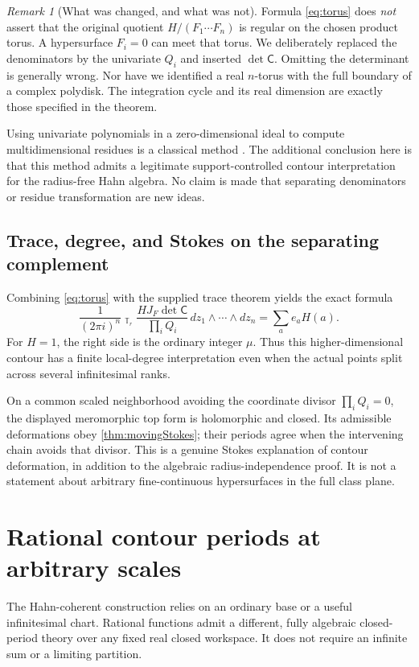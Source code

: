 \documentclass[11pt,letterpaper]{article}
\theoremstyle{definition}
\theoremstyle{remark}
\newtheorem{remark}[theorem]{Remark}
\newcommand{\HInt}{\mathop{\int^{\!H}}\nolimits}
\numberwithin{equation}{section}
\begin{document}
\begin{remark}[What was changed, and what was not]\label{rem:toruslimits}
Formula \eqref{eq:torus} does \emph{not} assert that the original quotient $H/(F_1\cdots F_n)$ is regular on the chosen product torus. A hypersurface $F_i=0$ can meet that torus. We deliberately replaced the denominators by the univariate $Q_i$ and inserted $\det\mathsf C$. Omitting the determinant is generally wrong. Nor have we identified a real $n$-torus with the full boundary of a complex polydisk. The integration cycle and its real dimension are exactly those specified in the theorem.
\end{remark}
Using univariate polynomials in a zero-dimensional ideal to compute multidimensional residues is a classical method \cite[\S0]{CDS}. The additional conclusion here is that this method admits a legitimate support-controlled contour interpretation for the radius-free Hahn algebra. No claim is made that separating denominators or residue transformation are new ideas.

\subsection{Trace, degree, and Stokes on the separating complement}
Combining \eqref{eq:torus} with the supplied trace theorem yields the exact formula
\begin{equation}\label{eq:torustrace}
\frac1{(2\pi i)^n}\HInt_{\mathbb T_r}
 \frac{H J_F\det\mathsf C}{\prod_iQ_i}\,dz_1\wedge\cdots\wedge dz_n
=\sum_a e_aH(a).
\end{equation}
For $H=1$, the right side is the ordinary integer $\mu$. Thus this higher-dimensional contour has a finite local-degree interpretation even when the actual points split across several infinitesimal ranks.

On a common scaled neighborhood avoiding the coordinate divisor $\prod_iQ_i=0$, the displayed meromorphic top form is holomorphic and closed. Its admissible deformations obey \cref{thm:movingStokes}; their periods agree when the intervening chain avoids that divisor. This is a genuine Stokes explanation of contour deformation, in addition to the algebraic radius-independence proof. It is not a statement about arbitrary fine-continuous hypersurfaces in the full class plane.

\section{Rational contour periods at arbitrary scales}\label{sec:rational}
The Hahn-coherent construction relies on an ordinary base or a useful infinitesimal chart. Rational functions admit a different, fully algebraic closed-period theory over any fixed real closed workspace. It does not require an infinite sum or a limiting partition.
\end{document}
